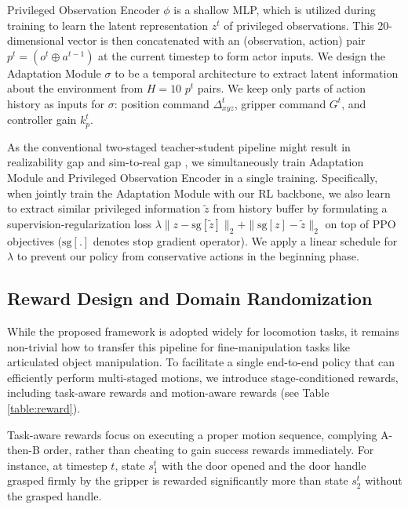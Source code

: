 Privileged Observation Encoder $\phi$ is a shallow MLP, which is utilized during training to learn the latent representation $z^t$ of privileged observations. This 20-dimensional vector is then concatenated with an (observation, action) pair $p^t = (o^t\oplus a^{t-1})$ at the current timestep to form actor inputs. We design the Adaptation Module $\sigma$ to be a temporal architecture to extract latent information about the environment from $H=10$ $p^t$ pairs. We keep only parts of action history as inputs for $\sigma$: position command $\Delta^t_{xyz}$, gripper command $G^t$, and controller gain $k_p^t$.

As the conventional two-staged teacher-student pipeline might result in realizability gap and sim-to-real gap \cite{deepwholebodycontrol}, we simultaneously train Adaptation Module and Privileged Observation Encoder in a single training. Specifically, when jointly train the Adaptation Module with our RL backbone, we also learn to extract similar privileged information $\tilde{z}$ from history buffer by formulating a supervision-regularization loss $\lambda \|z - \text{sg}[\tilde{z}]\|_2 + \|\text{sg}[z] - \tilde{z}\|_2$ on top of PPO objectives ($\text{sg}[.]$ denotes stop gradient operator). We apply a linear schedule for $\lambda$ to prevent our policy from conservative actions in the beginning phase.

\subsection{Reward Design and Domain Randomization} \label{method:reward}
While the proposed framework is adopted widely for locomotion tasks, it remains non-trivial how to transfer this pipeline for fine-manipulation tasks like articulated object manipulation. To facilitate a single end-to-end policy that can efficiently perform multi-staged motions, we introduce stage-conditioned rewards, including task-aware rewards and motion-aware rewards (see Table \ref{table:reward}). 

Task-aware rewards focus on executing a proper motion sequence, complying A-then-B order, rather than cheating to gain success rewards immediately. For instance, at timestep $t$, state $s_1^t$ with the door opened and the door handle grasped firmly by the gripper is rewarded significantly more than state $s_2^t$ without the grasped handle. 

